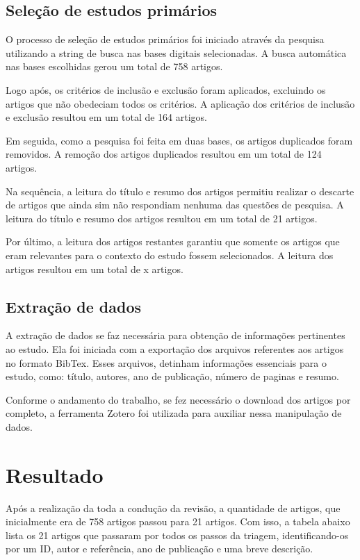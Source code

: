 \subsection{Seleção de estudos primários}

O processo de seleção de estudos primários foi iniciado através da pesquisa utilizando a string de busca nas bases digitais selecionadas. A busca automática nas bases escolhidas gerou um total de 758 artigos.

Logo após, os critérios de inclusão e exclusão foram aplicados, excluindo os artigos que não obedeciam todos os critérios. A aplicação dos critérios de inclusão e exclusão resultou em um total de 164 artigos.

Em seguida, como a pesquisa foi feita em duas bases, os artigos duplicados foram removidos. A remoção dos artigos duplicados resultou em um total de 124 artigos.

Na sequência, a leitura do título e resumo dos artigos permitiu realizar o descarte de artigos que ainda sim não respondiam nenhuma das questões de pesquisa. A leitura do título e resumo dos artigos resultou em um total de 21 artigos.

Por último, a leitura dos artigos restantes garantiu que somente os artigos que eram relevantes para o contexto do estudo fossem selecionados. A leitura dos artigos resultou em um total de x artigos.

\subsection{Extração de dados}

A extração de dados se faz necessária para obtenção de informações pertinentes ao estudo. Ela foi iniciada com a exportação dos arquivos referentes aos artigos no formato BibTex. Esses arquivos, detinham informações essenciais para o estudo, como: título, autores, ano de publicação, número de paginas e resumo.

Conforme o andamento do trabalho, se fez necessário o download dos artigos por completo, a ferramenta Zotero foi utilizada para auxiliar nessa manipulação de dados.

\section{Resultado}

Após a realização da toda a condução da revisão, a quantidade de artigos, que inicialmente era de 758 artigos passou para 21 artigos. Com isso, a tabela abaixo lista os 21 artigos que passaram por todos os passos da triagem, identificando-os por um ID, autor e referência, ano de publicação e uma breve descrição. 

